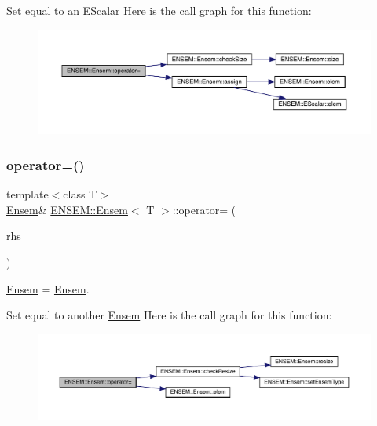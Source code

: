 Set equal to an \mbox{\hyperlink{classENSEM_1_1EScalar}{E\+Scalar}} Here is the call graph for this function\+:
\nopagebreak
\begin{figure}[H]
\begin{center}
\leavevmode
\includegraphics[width=350pt]{d7/d3e/classENSEM_1_1Ensem_a376ab0239198595a09384c13d7a1ad1c_cgraph}
\end{center}
\end{figure}
\mbox{\label{classENSEM_1_1Ensem_a2f4f881dde88dfaf425051580e477e6c}} 
\subsubsection{\texorpdfstring{operator=()}{operator=()}\hspace{0.1cm}{\footnotesize\ttfamily [10/15]}}
{\footnotesize\ttfamily template$<$class T$>$ \\
\mbox{\hyperlink{classENSEM_1_1Ensem}{Ensem}}\& \mbox{\hyperlink{classENSEM_1_1Ensem}{E\+N\+S\+E\+M\+::\+Ensem}}$<$ T $>$\+::operator= (\begin{DoxyParamCaption}\item[{const \mbox{\hyperlink{classENSEM_1_1Ensem}{Ensem}}$<$ T $>$ \&}]{rhs }\end{DoxyParamCaption})\hspace{0.3cm}{\ttfamily [inline]}}



\mbox{\hyperlink{classENSEM_1_1Ensem}{Ensem}} = \mbox{\hyperlink{classENSEM_1_1Ensem}{Ensem}}. 

Set equal to another \mbox{\hyperlink{classENSEM_1_1Ensem}{Ensem}} Here is the call graph for this function\+:
\nopagebreak
\begin{figure}[H]
\begin{center}
\leavevmode
\includegraphics[width=350pt]{d7/d3e/classENSEM_1_1Ensem_a2f4f881dde88dfaf425051580e477e6c_cgraph}
\end{center}
\end{figure}
\mbox{\label{classENSEM_1_1Ensem_a2f4f881dde88dfaf425051580e477e6c}} 
